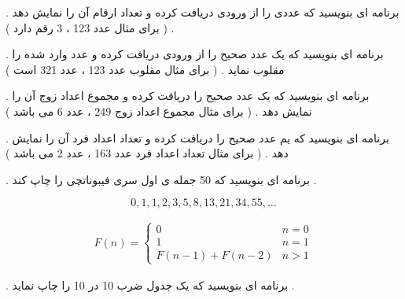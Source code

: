 \documentclass[12pt]{article}
\begin{document}
 . برنامه ای بنویسید که عددی را از ورودی دریافت کرده و تعداد ارقام آن را نمایش دهد . ( برای مثال عدد 123 ، 3 رقم دارد )

















 . برنامه ای بنویسید که یک عدد صحیح را از ورودی دریافت کرده و عدد وارد شده را مقلوب نماید . ( برای مثال مقلوب عدد 123 ، عدد 321 است )















 . برنامه ای بنویسید که یک عدد صحیح را دریافت کرده و مجموع اعداد زوج آن را نمایش دهد . ( برای مثال مجموع اعداد زوج 249 ، عدد 6 می باشد )








 . برنامه ای بنویسید که یم عدد صحیح را دریافت کرده و تعداد اعداد فرد آن را نمایش دهد . ( برای مثال تعداد اعداد فرد عدد 163 ، عدد 2 می باشد )














 . برنامه ای بنویسید که 50 جمله ی اول سری فیبوناتچی را چاپ کند .

$$
0 , 1 , 1 , 2 , 3 , 5 , 8 , 13 , 21 , 34 , 55 , \dots
$$


\begin{align*}
F(n) = 
\begin{cases}
0 & n = 0 \\
1 & n = 1 \\
F(n-1) + F(n-2) & n > 1 
\end{cases}
\end{align*}








 . برنامه ای بنویسید که یک جدول ضرب 10 در 10 را چاپ نماید .
\end{document}
